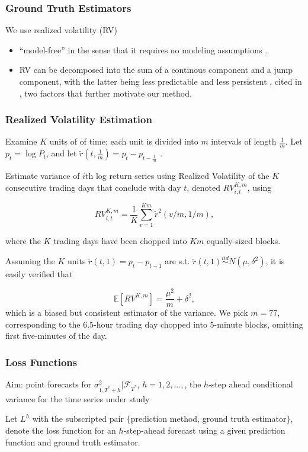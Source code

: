 \documentclass[9pt]{beamer}
\newcommand{\simiid}{\stackrel{iid}{\sim}} %
\def\E{\mathbb{E}} %
\theoremstyle{definition}
\begin{document}
\begin{frame}
\frametitle{Ground Truth Estimators}

We use realized volatility (RV)
\begin{itemize}
\item ``model-free'' in the sense that it requires no modeling assumptions \parencite[][]{andersen2010stochastic}.  
\item RV can be decomposed into the sum of a continous component and a jump component, with the latter being less predictable and less persistent \parencite[][]{andersen2007roughing}, cited in \cite[][]{de2006forecasting}, two factors that further motivate our method.
\end{itemize}

\end{frame}

\begin{frame}
    \frametitle{Realized Volatility Estimation}

Examine $K$ units of of time; each unit is divided into $m$ intervals of length $\frac{1}{m}$.  Let $p_{t} = \log{P_{t}}$, and let $\tilde{r}(t,\frac{1}{m}) = p_{t} - p_{t-\frac{1}{m}}$  \parencite[][]{andersen2009realized}. 

\bigbreak

Estimate variance of $i$th log return series using Realized Volatility of the $K$ consecutive trading days that conclude with day $t$, denoted $RV_{i,t}^{K,m}$, using

$$RV_{i,t}^{K,m} = \frac{1}{K}\sum^{Km}_{v=1}\tilde{r}^{2}(v/m,1/m),$$

where the $K$ trading days have been chopped into $Km$ equally-sized blocks.

Assuming the $K$ units $\tilde{r}(t, 1) = p_{t} - p_{t-1}$ are s.t. $\tilde{r}(t, 1) \simiid N(\mu, \delta^{2})$, it is easily verified that 

$$\E[RV^{K,m}] = \frac{\mu^{2}}{m} + \delta^{2},$$
which is a biased but consistent estimator of the variance.  We pick $m = 77$, corresponding to the 6.5-hour trading day chopped into 5-minute blocks, omitting first five-minutes of the day.

\end{frame}

\begin{frame}
\frametitle{Loss Functions}

Aim: point forecasts for $\sigma^{2}_{1,T^{*}+h}|\mathcal{F}_{T^{*}}$, $h=1,2,...,$, the $h$-step ahead conditional variance for the time series under study\\

\bigbreak
 
Let $L^{h}$ with the subscripted pair $\{$prediction method, ground truth estimator$\}$, denote the loss function for an $h$-step-ahead forecast using a given prediction function and ground truth estimator.  

\end{frame}
\end{document}
